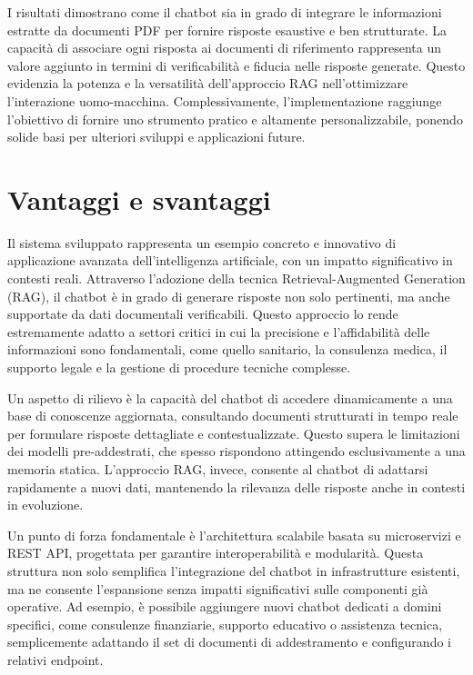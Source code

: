 \documentclass[a4paper,twoside,12pt]{toptesi}
\begin{document}
I risultati dimostrano come il chatbot sia in grado di integrare le informazioni estratte da documenti PDF per fornire risposte esaustive e ben strutturate. La capacità di associare ogni risposta ai documenti di riferimento rappresenta un valore aggiunto in termini di verificabilità e fiducia nelle risposte generate. Questo evidenzia la potenza e la versatilità dell'approccio RAG nell'ottimizzare l'interazione uomo-macchina. Complessivamente, l'implementazione raggiunge l'obiettivo di fornire uno strumento pratico e altamente personalizzabile, ponendo solide basi per ulteriori sviluppi e applicazioni future.

\section{Vantaggi e svantaggi}
Il sistema sviluppato rappresenta un esempio concreto e innovativo di applicazione avanzata dell'intelligenza artificiale, con un impatto significativo in contesti reali. Attraverso l'adozione della tecnica Retrieval-Augmented Generation (RAG), il chatbot è in grado di generare risposte non solo pertinenti, ma anche supportate da dati documentali verificabili. Questo approccio lo rende estremamente adatto a settori critici in cui la precisione e l'affidabilità delle informazioni sono fondamentali, come quello sanitario, la consulenza medica, il supporto legale e la gestione di procedure tecniche complesse.

Un aspetto di rilievo è la capacità del chatbot di accedere dinamicamente a una base di conoscenze aggiornata, consultando documenti strutturati in tempo reale per formulare risposte dettagliate e contestualizzate. Questo supera le limitazioni dei modelli pre-addestrati, che spesso rispondono attingendo esclusivamente a una memoria statica. L’approccio RAG, invece, consente al chatbot di adattarsi rapidamente a nuovi dati, mantenendo la rilevanza delle risposte anche in contesti in evoluzione.

Un punto di forza fondamentale è l'architettura scalabile basata su microservizi e REST API, progettata per garantire interoperabilità e modularità. Questa struttura non solo semplifica l'integrazione del chatbot in infrastrutture esistenti, ma ne consente l'espansione senza impatti significativi sulle componenti già operative. Ad esempio, è possibile aggiungere nuovi chatbot dedicati a domini specifici, come consulenze finanziarie, supporto educativo o assistenza tecnica, semplicemente adattando il set di documenti di addestramento e configurando i relativi endpoint.
\end{document}
